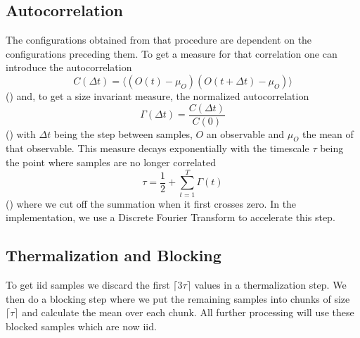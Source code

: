 \subsection{Autocorrelation}
The configurations obtained from that procedure are dependent on the configurations preceding them.  To get a measure for that correlation one can introduce the autocorrelation
\begin{equation}
	C(\Delta t) = \langle(O(t) - \mu_O)(O(t + \Delta t) - \mu_O) \rangle
\end{equation}
(\citet[eq. (41)]{bootstrap}) and, to get a size invariant measure, the normalized autocorrelation
\begin{equation}
	\Gamma(\Delta t) = \frac{C(\Delta t)}{C(0)}
\end{equation}
(\citet[eq. (43)]{bootstrap}) with $\Delta t$ being the step between samples, $O$ an observable and $\mu_O$ the mean of that observable. This measure decays exponentially with the timescale $\tau$ being the point where samples are no longer correlated
\begin{equation}
	\tau = \frac{1}{2} + \sum^{T}_{t=1}{\Gamma(t)}
\end{equation}
(\citet[eq. (46)]{bootstrap}) where we cut off the summation when it first crosses zero. In the implementation, we use a Discrete Fourier Transform to accelerate this step.

\subsection{Thermalization and Blocking}\label{sec:blocking}
To get iid samples we discard the first $\lceil 3\tau \rceil$ values in a thermalization step. We then do a blocking step where we put the remaining samples into chunks of size $\lceil \tau \rceil$ and calculate the mean over each chunk. All further processing will use these blocked samples which are now iid.

